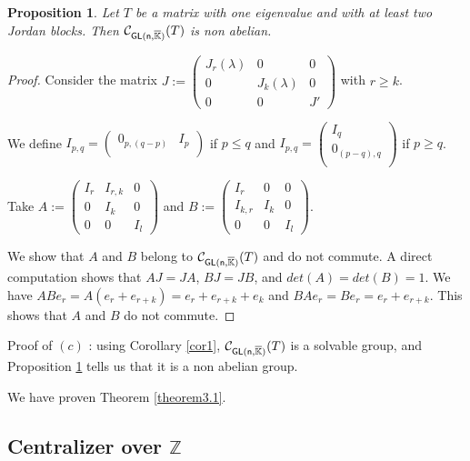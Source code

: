 \documentclass[a4paper,11pt]{article}
\newtheorem{proposition}{Proposition}[section]
\theoremstyle{definition}
\newcommand{\Z}{\mathbb Z}
\newcommand{\C}{\mathcal C}
\newcommand{\K}{\mathbb K}
\def \GL{\sf{GL}}
\begin{document}
\begin{proposition}\label{prop8}
    Let $T$ be a matrix with one eigenvalue and with at least two Jordan blocks. Then $\C_{\GL(n,\overline{\K})}(T)$ is non abelian.
\end{proposition}

\begin{proof}
Consider the matrix $J:=\begin{pmatrix}
J_r(\lambda) & 0& 0 \\
0 & J_k(\lambda) & 0\\
0 & 0 & J' 
\end{pmatrix}$ with $r \ge k$.

We define $I_{p, q}=\begin{pmatrix}
0_{p, (q-p)} & I_p \\
\end{pmatrix}$
if $p\le q$
and 
$I_{p, q}=\begin{pmatrix}
I_q\\ 0_{(p-q), q} \\
\end{pmatrix}$ if $p\ge q$.

Take $A:=\begin{pmatrix}
I_r & I_{r, k}& 0 \\
0 & I_k & 0\\
0 & 0 & I_l 
\end{pmatrix}$
and $B:=\begin{pmatrix}
I_r &0 & 0 \\
I_{k, r}& I_k & 0\\
0 & 0 & I_l 
\end{pmatrix}$.

We show that $A$ and $B$ belong to $\C_{\GL(n,\overline{\K})}(T)$ and do not commute.
A direct computation shows that $AJ=JA$, $BJ=JB$, and $det(A)=det(B)=1$. 
We have  $ABe_r=A(e_r+e_{r+k})=e_r+e_{r+k}+e_{k}$
and $BAe_r=Be_r=e_r+e_{r+k}$. This shows that $A$ and $B$ do not commute.

\end{proof}

Proof of $(c)$ : using Corollary \ref{cor1},  $\C_{\GL(n,\overline{\K})}(T)$ is a solvable group, and Proposition \ref{prop8} tells us that it is a non abelian group.

We have proven Theorem \ref{theorem3.1}.


\subsection[Centralizer over Z]{Centralizer over \(\Z\)}
\end{document}

